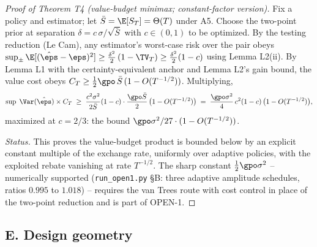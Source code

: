\documentclass[11pt]{article}
\begin{document}
\begin{proof}[Proof of Theorem T4 (value-budget minimax; constant-factor
version)]
Fix a policy and estimator; let $\bar S = \E[S_T] = \Theta(T)$ under A5.
Choose the two-point prior at separation $\delta = c\,\sigma/\sqrt{\bar S}$
with $c \in (0,1)$ to be optimized. By the testing reduction (Le Cam), any
estimator's worst-case risk over the pair obeys
$\sup_{\pm} \E[(\hat\eps - \eps)^2] \ge \tfrac{\delta^2}{2}\,(1 - \TV_T)
\ge \tfrac{\delta^2}{2}(1 - c)$ using Lemma L2(ii). By Lemma L1 with the
certainty-equivalent anchor and Lemma L2's gain bound, the value cost obeys
$C_T \ge \tfrac{1}{2}\gpo\,\bar S\,(1 - O(T^{-1/2}))$. Multiplying,
\[
\sup\; \Var(\hat\eps)\times C_T
 \;\ge\; \frac{c^2\sigma^2}{2\bar S}(1-c)\cdot
 \frac{\gpo \bar S}{2}\,\big(1 - O(T^{-1/2})\big)
 \;=\; \frac{\gpo\sigma^2}{4}\,c^2(1-c)\,\big(1 - O(T^{-1/2})\big),
\]
maximized at $c = 2/3$: the bound $\gpo\sigma^2/27 \cdot (1 - O(T^{-1/2}))$.

\emph{Status.} This proves the value-budget product is bounded below by an
explicit constant multiple of the exchange rate, uniformly over adaptive
policies, with the exploited rebate vanishing at rate $T^{-1/2}$. The
sharp constant $\tfrac{1}{2}\gpo\sigma^2$ -- numerically supported
(\texttt{run\_open1.py} \S B: three adaptive amplitude schedules, ratios
$0.995$ to $1.018$) -- requires the van Trees route with
cost control in place of the two-point reduction and is part of OPEN-1.
\end{proof}

\subsection*{E. Design geometry}
\end{document}
